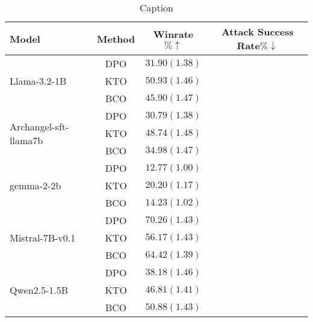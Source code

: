 \begin{table}[]
    \centering
    \begin{tabular}{lccc}
    \toprule
    Model & Method & Winrate$\% \uparrow$ & Attack Success Rate$\% \downarrow$ \\
    \midrule
    \multirow{3}{*}{Llama-3.2-1B} & DPO & $31.90(1.38)$ \\
    & KTO & $50.93(1.46)$ \\
    & BCO & $45.90(1.47)$\\
    \midrule 
    \multirow{3}{*}{Archangel-sft-llama7b} & DPO & $30.79(1.38)$ \\
    & KTO & $48.74(1.48)$ \\
    & BCO & $34.98(1.47)$ \\
    \midrule
    \multirow{3}{*}{gemma-2-2b} & DPO & $12.77(1.00)$ \\
    & KTO & $20.20(1.17)$ \\
    & BCO & $14.23(1.02)$ \\
    \midrule
    \multirow{3}{*}{Mistral-7B-v0.1} & DPO & $70.26(1.43)$ \\
    & KTO & $56.17(1.43)$\\
    & BCO & $64.42(1.39)$ \\
    \midrule 
    \multirow{3}{*}{Qwen2.5-1.5B} & DPO & $38.18(1.46)$  \\
    & KTO & $46.81(1.41)$ \\
    & BCO & $50.88(1.43)$ \\
    \bottomrule
    \end{tabular}
    \caption{Caption}
    \label{tab:my_label}
\end{table}